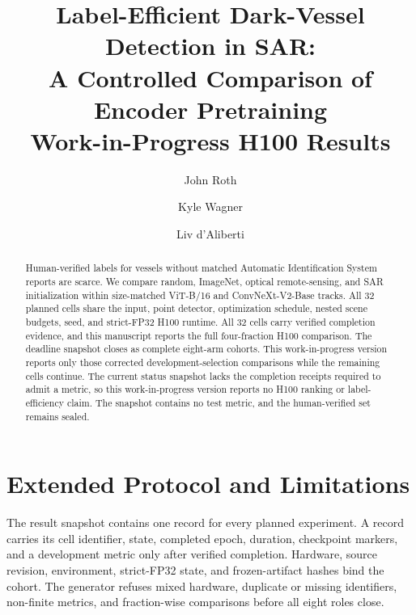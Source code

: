 \documentclass[runningheads]{vendor/llncs}
\begin{document}
\title{Label-Efficient Dark-Vessel Detection in SAR:\\
A Controlled Comparison of Encoder Pretraining
\ifHFullGridComplete\else
\\{\large Work-in-Progress H100 Results}\fi}
\author{John Roth \and Kyle Wagner \and Liv d'Aliberti}
\maketitle
\begin{abstract}
Human-verified labels for vessels without matched Automatic Identification
System reports are scarce. We compare random, ImageNet, optical
remote-sensing, and SAR initialization within size-matched ViT-B/16 and
ConvNeXt-V2-Base tracks. All 32 planned cells share the input, point detector,
optimization schedule, nested scene budgets, seed, and strict-FP32 H100
runtime.
\ifHFullGridComplete
All 32 cells carry verified completion evidence, and this manuscript reports
the full four-fraction H100 comparison.
\else
\ifHHasReportableCohort
The deadline snapshot closes \HResultReportableFractions{} as complete
eight-arm cohorts. This work-in-progress version reports only those corrected
development-selection comparisons while the remaining cells continue.
\else
The current status snapshot lacks the completion receipts required to admit a
metric, so this work-in-progress version reports no H100 ranking or
label-efficiency claim.
\fi
\fi
The snapshot contains no test metric, and the human-verified set remains sealed.
\end{abstract}





\section{Extended Protocol and Limitations}



The result snapshot contains one record for every planned experiment. A record
carries its cell identifier, state, completed epoch, duration, checkpoint
markers, and a development metric only after verified completion. Hardware,
source revision, environment, strict-FP32 state, and frozen-artifact hashes
bind the cohort. The generator refuses mixed hardware, duplicate or missing
identifiers, non-finite metrics, and fraction-wise comparisons before all eight
roles close.
\end{document}
